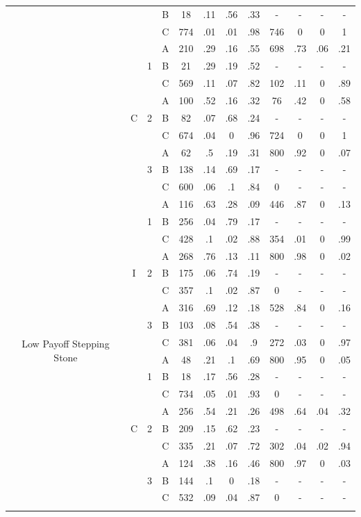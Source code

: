 \begin{table}[h]
\begin{tabular}{ c c c c c c c c c c c c}
& & & B & 18 & .11 & .56 & .33 & - & - & - & - \\ 
& & & C & 774 & .01 & .01 & .98 & 746 & 0 & 0 & 1 \\ 
& \multirow{9}{0em}{C} & \multirow{3}{0em}{1} & A & 210 & .29 & .16 & .55 & 698 & .73 & .06 & .21 \\ 
& & & B & 21 & .29 & .19 & .52 & - & - & - & - \\ 
& & & C & 569 & .11 & .07 & .82 & 102 & .11 & 0 & .89 \\
& & \multirow{3}{0em}{2} & A & 100 & .52 & .16 & .32 & 76 & .42 & 0 & .58 \\ 
& & & B & 82 & .07 & .68 & .24 & - & - & - & - \\ 
& & & C & 674 & .04 & 0 & .96 & 724 & 0 & 0 & 1 \\ 
& & \multirow{3}{0em}{3} & A & 62 & .5 & .19 & .31 & 800 & .92 & 0 & .07 \\ 
& & & B & 138 & .14 & .69 & .17 & - & - & - & - \\ 
& & & C & 600 & .06 & .1 & .84 & 0 & - & - & - \\
\multirow{18}{8em}{Low Payoff Stepping Stone} & \multirow{9}{0em}{I} & \multirow{3}{0em}{1} & A & 116 & .63 & .28 & .09 & 446 & .87 & 0 & .13 \\ 
& & & B & 256 & .04 & .79 & .17 & - & - & - & - \\ 
& & & C & 428 & .1 & .02 & .88 & 354 & .01 & 0 & .99 \\
& & \multirow{3}{0em}{2} & A & 268 & .76 & .13 & .11 & 800 & .98 & 0 & .02 \\ 
& & & B & 175 & .06 & .74 & .19 & - & - & - & - \\ 
& & & C & 357 & .1 & .02 & .87 & 0 & - & - & - \\ 
& & \multirow{3}{0em}{3} & A & 316 & .69 & .12 & .18 & 528 & .84 & 0 & .16 \\ 
& & & B & 103 & .08 & .54 & .38 & - & - & - & - \\ 
& & & C & 381 & .06 & .04 & .9 & 272 & .03 & 0 & .97 \\ 
& \multirow{9}{0em}{C} & \multirow{3}{0em}{1} & A & 48 & .21 & .1 & .69 & 800 & .95 & 0 & .05 \\ 
& & & B & 18 & .17 & .56 & .28 & - & - & - & - \\ 
& & & C & 734 & .05 & .01 & .93 & 0 & - & - & - \\
& & \multirow{3}{0em}{2} & A & 256 & .54 & .21 & .26 & 498 & .64 & .04 & .32 \\ 
& & & B & 209 & .15 & .62 & .23 & - & - & - & - \\ 
& & & C & 335 & .21 & .07 & .72 & 302 & .04 & .02 & .94 \\
& & \multirow{3}{0em}{3} & A & 124 & .38 & .16 & .46 & 800 & .97 & 0 & .03 \\ 
& & & B & 144 & .1 & 0 & .18 & - & - & - & - \\ 
& & & C & 532 & .09 & .04 & .87 & 0 & - & - & - \\ 
\Xhline{.1em}
\end{tabular}
\end{table}%

